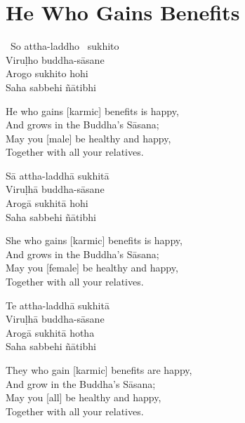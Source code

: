 \suttaRef{[AN 5.36]}

\clearpage



\section{He Who Gains Benefits}
\label{he-who-gains-benefits}

\begin{pali-hang-together}
  \anglebracketleft\ \hspace{-0.5mm}So attha-laddho \hspace{-0.5mm}\anglebracketright\ sukhito\\
  Viruḷho buddha-sāsane\\
  Arogo sukhito hohi\\
  Saha sabbehi ñātibhi
\end{pali-hang-together}

\begin{english-verses}
  He who gains [karmic] benefits is happy,\\
  And grows in the Buddha's Sāsana;\\
  May you [male] be healthy and happy,\\
  Together with all your relatives.
\end{english-verses}

\begin{pali-hang}
  Sā attha-laddhā sukhitā\\
  Viruḷhā buddha-sāsane\\
  Arogā sukhitā hohi\\
  Saha sabbehi ñātibhi
\end{pali-hang}

\begin{english-verses}
  She who gains [karmic] benefits is happy,\\
  And grows in the Buddha's Sāsana;\\
  May you [female] be healthy and happy,\\
  Together with all your relatives.
\end{english-verses}

\begin{pali-hang}
  Te attha-laddhā sukhitā\\
  Viruḷhā buddha-sāsane\\
\ifninebythirteenversion\clearpage\fi
  Arogā sukhitā hotha\\
  Saha sabbehi ñātibhi
\end{pali-hang}

\ifafiveversion\clearpage\fi

\begin{english-verses}
  They who gain [karmic] benefits are happy,\\
  And grow in the Buddha's Sāsana;\\
\ifbfiveversion\clearpage\fi
  May you [all] be healthy and happy,\\
  Together with all your relatives.
\end{english-verses}

\suttaRef{[AN 3.155]}

\ifdigitalversion{}\fi

